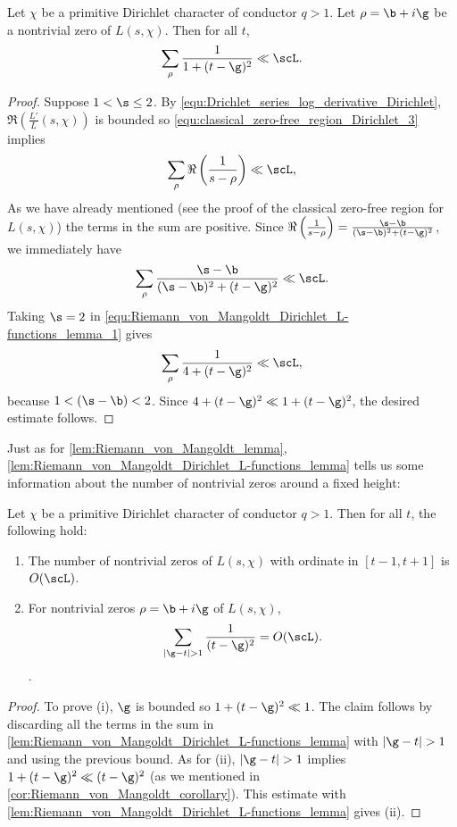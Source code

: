       \begin{lemma}\label{lem:Riemann_von_Mangoldt_Dirichlet_L-functions_lemma}
        Let $\chi$ be a primitive Dirichlet character of conductor $q > 1$. Let $\rho = \b+i\g$ be a nontrivial zero of $L(s,\chi)$. Then for all $t$,
        \[
          \sum_{\rho}\frac{1}{1+(t-\g)^{2}} \ll \scL.
        \]
      \end{lemma}
      \begin{proof}
        Suppose $1 < \s \le 2$. By \cref{equ:Drichlet_series_log_derivative_Dirichlet}, $\Re\left(\frac{L'}{L}(s,\chi)\right)$ is bounded so \cref{equ:classical_zero-free_region_Dirichlet_3} implies
        \[
          \sum_{\rho}\Re\left(\frac{1}{s-\rho}\right) \ll \scL,
        \]
        As we have already mentioned (see the proof of the classical zero-free region for $L(s,\chi)$) the terms in the sum are positive. Since $\Re\left(\frac{1}{s-\rho}\right) = \frac{\s-\b}{(\s-\b)^{2}+(t-\g)^{2}}$, we immediately have
        \begin{equation}\label{equ:Riemann_von_Mangoldt_Dirichlet_L-functions_lemma_1}
          \sum_{\rho}\frac{\s-\b}{(\s-\b)^{2}+(t-\g)^{2}} \ll \scL.
        \end{equation}
        Taking $\s = 2$ in \cref{equ:Riemann_von_Mangoldt_Dirichlet_L-functions_lemma_1} gives
        \[
          \sum_{\rho}\frac{1}{4+(t-\g)^{2}} \ll \scL,
        \]
        because $1 < (\s-\b) < 2$. Since $4+(t-\g)^{2} \ll 1+(t-\g)^{2}$, the desired estimate follows.
      \end{proof}

      Just as for \cref{lem:Riemann_von_Mangoldt_lemma}, \cref{lem:Riemann_von_Mangoldt_Dirichlet_L-functions_lemma} tells us some information about the number of nontrivial zeros around a fixed height:

      \begin{corollary}\label{cor:Riemann_von_Mangoldt_Dirichlet_L-functions_corollary}
        Let $\chi$ be a primitive Dirichlet character of conductor $q > 1$. Then for all $t$, the following hold:
        \begin{enumerate}[label=(\roman*)]
          \item The number of nontrivial zeros of $L(s,\chi)$ with ordinate in $[t-1,t+1]$ is $O(\scL)$.
          \item For nontrivial zeros $\rho = \b+i\g$ of $L(s,\chi)$,
          \[
            \sum_{|\g-t| > 1}\frac{1}{(t-\g)^{2}} = O(\scL).
          \].
        \end{enumerate}
      \end{corollary}
      \begin{proof}
        To prove (i), $\g$ is bounded so $1+(t-\g)^{2} \ll 1$. The claim follows by discarding all the terms in the sum in \cref{lem:Riemann_von_Mangoldt_Dirichlet_L-functions_lemma} with $|\g-t| > 1$ and using the previous bound. As for (ii), $|\g-t| > 1$ implies $1+(t-\g)^{2} \ll (t-\g)^{2}$ (as we mentioned in \cref{cor:Riemann_von_Mangoldt_corollary}). This estimate with \cref{lem:Riemann_von_Mangoldt_Dirichlet_L-functions_lemma} gives (ii).
      \end{proof}

